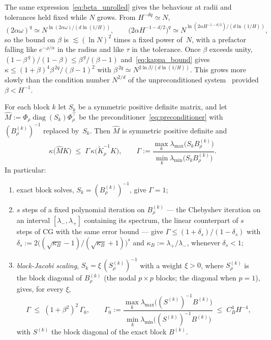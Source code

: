 \documentclass[hidelinks]{siamart}
\theoremstyle{nonumberplain}
\numberwithin{theorem}{section}
\begin{document}
The same expression~\eqref{eq:beta_unrolled} gives the behaviour at radii
and tolerances held fixed while $N$ grows.  From $H^{-dq} \simeq N$,
\[
  (2\alpha\omega)^{q} \simeq N^{\ln(2\alpha\omega)/(d\ln(1/H))},
  \qquad
  \bigl(2\alpha H^{-1-d/2}\bigr)^{q}
    \simeq N^{\ln(2\alpha H^{-1-d/2})/(d\ln(1/H))} ,
\]
so the bound on $\beta$ is $\lesssim (\ln N)^2$ times a fixed power
of~$N$, with a prefactor falling like $e^{-\rho/\alpha}$ in the radius and
like $\tau$ in the tolerance.  Once $\beta$ exceeds unity,
$(1-\beta^{\,q})/(1-\beta) \leq \beta^{\,q}/(\beta-1)$
and~\eqref{eq:kappa_bound} gives
$\kappa \leq (1+\beta)^4 \beta^{\,2q}/(\beta-1)^2$ with
$\beta^{\,2q} \simeq N^{2\ln\beta/(d\ln(1/H))}$. This grows more slowly
than the condition number $N^{2/d}$ of the unpreconditioned
system~\cite{ErnGuermond2004} provided $\beta < H^{-1}$.

\begin{corollary}\label{cor:apply_factor}
For each block $k$ let $S_k$ be a symmetric positive definite matrix, and
let $\widehat{M} := \Phi_\rho \operatorname{diag}(S_k) \Phi_\rho^\top$
be the preconditioner~\eqref{eq:preconditioner} with
$(B^{(k)}_\rho)^{-1}$ replaced by~$S_k$.  Then $\widehat{M}$ is
symmetric positive definite and
\begin{equation}\label{eq:apply_factor}
  \kappa\bigl(\widehat{M} K\bigr)
  \;\leq\; \Gamma\, \kappa\bigl(\widetilde{K}_\rho^{-1} K\bigr),
  \qquad
  \Gamma := \frac{\max_k \lambda_{\max}\bigl(S_k B^{(k)}_\rho\bigr)}
            {\min_k \lambda_{\min}\bigl(S_k B^{(k)}_\rho\bigr)} .
\end{equation}
In particular:
\begin{enumerate}
  \item[(i)] exact block solves, $S_k = (B^{(k)}_\rho)^{-1}$, give
    $\Gamma = 1$;
  \item[(ii)] $s$ steps of a fixed polynomial iteration on
    $B^{(k)}_\rho$ --- the Chebyshev iteration on an interval
    $[\lambda_-, \lambda_+]$ containing its spectrum, the linear
    counterpart of $s$ steps of CG with the same error bound --- give
    $\Gamma \leq (1+\delta_s)/(1-\delta_s)$ with
    $\delta_s := 2\bigl((\sqrt{\kappa_B}-1)/(\sqrt{\kappa_B}+1)\bigr)^{s}$
    and $\kappa_B := \lambda_+/\lambda_-$, whenever $\delta_s < 1$;
  \item[(iii)] \emph{block-Jacobi scaling}, $S_k = \xi\,(S^{(k)}_\rho)^{-1}$
    with a weight $\xi > 0$, where $S^{(k)}_\rho$ is the block diagonal
    of $B^{(k)}_\rho$ (the nodal $p \times p$ blocks; the diagonal when
    $p = 1$), gives, for every $\xi$,
    \begin{equation}\label{eq:jacobi_factor}
      \Gamma \;\leq\; (1+\beta^2)^2\, \Gamma_0 ,
      \qquad
      \Gamma_0 := \frac{\max_k \lambda_{\max}\bigl((S^{(k)})^{-1} B^{(k)}\bigr)}
                       {\min_k \lambda_{\min}\bigl((S^{(k)})^{-1} B^{(k)}\bigr)}
      \;\leq\; C_B^4 H^{-4} ,
    \end{equation}
    with $S^{(k)}$ the block diagonal of the exact block $B^{(k)}$.
\end{enumerate}
\end{corollary}
\end{document}
